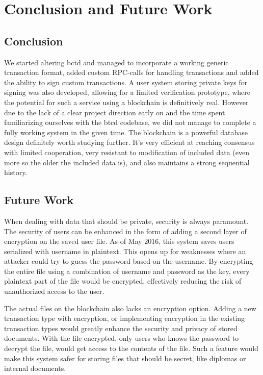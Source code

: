 \documentclass[12pt]{article}
\begin{document}
\section{Conclusion and Future Work}
\subsection{Conclusion}
We started altering bctd and managed to incorporate a working generic transaction format, added custom RPC-calls for handling transactions and added the ability to sign custom transactions. A user system storing private keys for signing was also developed, allowing for a limited verification prototype, where the potential for such a service using a blockchain is definitively real. However due to the lack of a clear project direction early on and the time spent familiarizing ourselves with the btcd codebase, we did not manage to complete a fully working system in the given time. The blockchain is a powerful database design definitely worth studying further. It's very efficient at reaching consensus with limited cooperation, very resistant to modification of included data (even more so the older the included data is), and also maintains a strong sequential history.

\subsection{Future Work}
When dealing with data that should be private, security is always paramount. The security of users can be enhanced in the form of adding a second layer of encryption on the saved user file. As of May 2016, this system saves users serialized with username in plaintext. This opens up for weaknesses where an attacker could try to guess the password based on the username. By encrypting the entire file using a combination of username and password as the key, every plaintext part of the file would be encrypted, effectively reducing the risk of unauthorized access to the user. 

The actual files on the blockchain also lacks an encryption option. Adding a new transaction type with encryption, or implementing encryption in the existing transaction types would greatly enhance the security and privacy of stored documents. With the file encrypted, only users who knows the password to decrypt the file, would get access to the contents of the file. Such a feature would make this system safer for storing files that should be secret, like diplomas or internal documents. 
\end{document}
